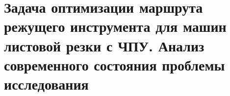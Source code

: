 
\chapter{%
  Задача оптимизации маршрута
  режущего инструмента
  для машин листовой резки с ЧПУ.
  Анализ современного состояния
  проблемы исследования
}
\label{ch:review}








